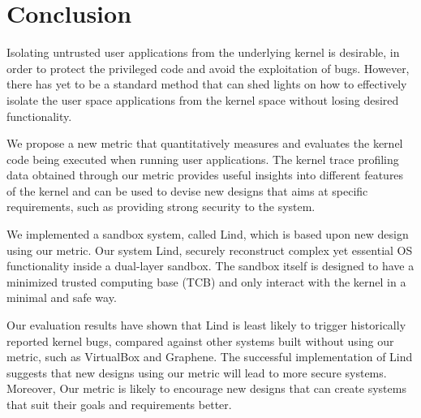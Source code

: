 \section{Conclusion}
\label{sec.conclusion}

Isolating untrusted user applications from the underlying kernel is desirable, in order to protect the privileged code and 
avoid the exploitation of bugs. However, there has yet to be a standard method that can shed lights on how to effectively
isolate the user space applications from the kernel space without losing desired functionality.

We propose a new metric that quantitatively measures and evaluates the kernel code being executed when running
user applications. The kernel trace profiling data obtained through our metric provides useful insights into different 
features of the kernel and can be used to devise new designs that aims at specific requirements, such as providing 
strong security to the system. 

We implemented a sandbox system, called Lind, which is based upon new design using our metric. 
Our system Lind, securely reconstruct complex yet essential OS functionality inside a dual-layer sandbox. 
The sandbox itself is designed to have a minimized trusted computing base (TCB) and only interact with the kernel
in a minimal and safe way. 

Our evaluation results have shown that Lind is least likely to trigger historically reported kernel bugs, compared against
other systems built without using our metric, such as VirtualBox and Graphene. The successful implementation of Lind
suggests that new designs using our metric will lead to more secure systems. Moreover, Our metric is likely to encourage
new designs that can create systems that suit their goals and requirements better. 